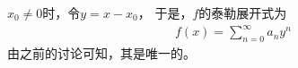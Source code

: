 \documentclass{article}
\begin{document}
$x_0 \neq 0$时，令$y = x - x_0$，
于是，$f$的泰勒展开式为
\begin{align*}
  f(x) = \sum \limits_{n = 0}^{\infty} a_n y^n
\end{align*}
由之前的讨论可知，其是唯一的。




\end{document}
